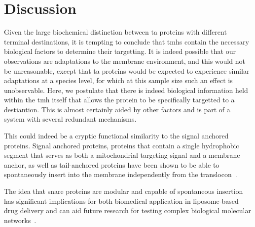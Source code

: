



\section{Discussion}

Given the large biochemical distinction between \gls{ta} proteins with different terminal destinations, it is tempting to conclude that \gls{tmh}s contain the necessary biological factors to determine their targetting.
It is indeed possible that our observations are adaptations to the membrane environment, and this would not be unreasonable, except that \gls{ta} proteins would be expected to experience similar adaptations at a species level, for which at this sample size such an effect is unobservable.
Here, we postulate that there is indeed biological information held within the \gls{tmh} itself that allows the protein to be specifically targetted to a destiantion.
This is almost certainly aided by other factors and is part of a system with several redundant mechanisms.

This could indeed be a cryptic functional similarity to the signal anchored proteins.
Signal anchored proteins, proteins that contain a single hydrophobic segment that serves as both a mitochondrial targeting signal and a membrane anchor, as well as tail-anchored proteins have been shown to be able to spontaneously insert into the membrane independently from the translocon~\cite{Elisa2012, Lan2000, Colombo2009}.

The idea that \gls{snare} proteins are modular and capable of spontaneous insertion has significant implications for both biomedical application in liposome-based drug delivery and can aid future research for testing complex biological molecular networks~\cite{Allen2013, Nordlund2014}.

